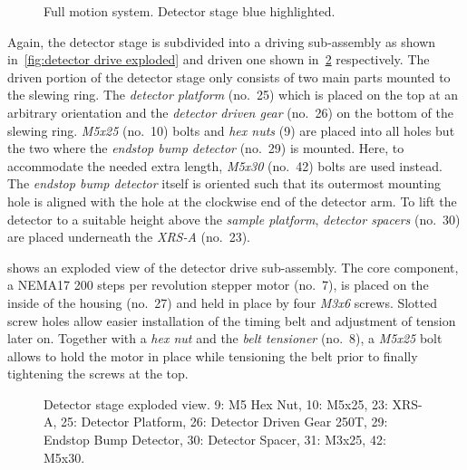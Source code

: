             \begin{figure}[!ht]
                \centering
                \caption[Full motion system. Detector stage blue highlighted]{Full motion system. Detector stage blue highlighted.}%
                \label{fig:xmagix full detector highlightes}%
            \end{figure}

            Again, the detector stage is subdivided into a driving sub-assembly as shown in~\cref{fig:detector drive exploded} and driven one shown in~\cref{fig:detector stage exploded} respectively.
            The driven portion of the detector stage only consists of two main parts mounted to the slewing ring.
            The \textit{detector platform} (no.~25) which is placed on the top at an arbitrary orientation and the \textit{detector driven gear} (no.~26) on the bottom of the slewing ring.
            \textit{M5x25} (no.~10) bolts and \textit{hex nuts} (9) are placed into all holes but the two where the \textit{endstop bump detector} (no.~29) is mounted.
            Here, to accommodate the needed extra length, \textit{M5x30} (no.~42) bolts are used instead.
            The \textit{endstop bump detector} itself is oriented such that its outermost mounting hole is aligned with the hole at the clockwise end of the detector arm.
            To lift the detector to a suitable height above the \textit{sample platform}, \textit{detector spacers} (no.~30) are placed underneath the \textit{XRS-A} (no.~23).\par\medskip

             shows an exploded view of the detector drive sub-assembly.
            The core component, a NEMA17 \num{200} steps per revolution stepper motor (no.~7), is placed on the inside of the housing (no.~27) and held in place by four \textit{M3x6} screws.
            Slotted screw holes allow easier installation of the timing belt and adjustment of tension later on.
            Together with a \textit{hex nut} and the \textit{belt tensioner} (no.~8), a \textit{M5x25} bolt allows to hold the motor in place while tensioning the belt prior to finally tightening the screws at the top.

            \begin{figure}[!h]
                \centering
                \caption[Detector stage exploded view]{Detector stage exploded view. 9: M5 Hex Nut, 10: M5x25, 23: XRS-A, 25: Detector Platform, 26: Detector Driven Gear 250T, 29: Endstop Bump Detector, 30: Detector Spacer, 31: M3x25, 42: M5x30.}%
                \label{fig:detector stage exploded}%
            \end{figure}
            
